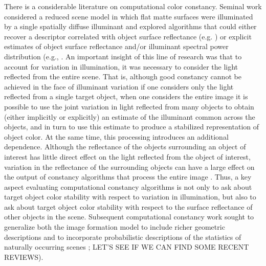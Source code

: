 \documentclass{jov}
\begin{document}
There is a considerable literature on computational color constancy. Seminal work considered a reduced scene model in which flat matte surfaces were illuminated by a single spatially diffuse illuminant and explored algorithms that could either recover a descriptor correlated with object surface reflectance (e.g. \cite{LandRetinex}) or explicit estimates of object surface reflectance and/or illuminant spectral power distribution (e.g., \cite{LandRetinex,Buchsbaum80,MaloneyWandell86}.
An important insight of this line of research was that to account for variation in illumination, it was necessary to consider the light reflected from the entire scene. That is, although good constancy cannot be achieved in the face of illuminant variation if one considers only the light reflected from a single target object, when one considers the entire image it is possible to use the joint variation in light reflected from many objects to obtain (either implicitly or explicitly) an estimate of the illuminant common across the objects, and in turn to use this estimate to produce a stabilized representation of object color.
At the same time, this processing introduces an additional dependence.  Although the reflectance of the objects surrounding an object of interest has little direct effect on the light reflected from the object of interest, variation in the reflectance of the surrounding objects can have a large effect on the output of constancy algorithms that process the entire image \cite{BrainardWandellRetinex}.
Thus, a key aspect evaluating computational constancy algorithms is not only to ask about target object color stability with respect to variation in illumination, but also to ask about target object color stability with respect to the surface reflectance of other objects in the scene.
Subsequent computational constancy work sought to generalize both the image formation model to include richer geometric descriptions and to incorporate probabilistic descriptions of the statistics of naturally occurring scenes \cite{funt1988color, D'ZmuraConstancy3, barron2012color, D'ZmuraIversonSinger,BrainardFreeman}; LET'S SEE IF WE CAN FIND SOME RECENT REVIEWS).



\end{document}
